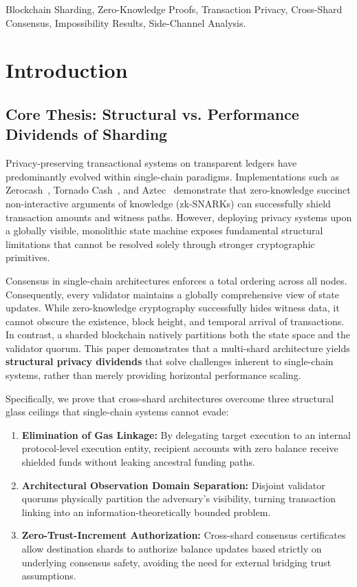 \documentclass[journal,10pt,twocolumn]{IEEEtran}
\theoremstyle{definition}
\theoremstyle{remark}
\begin{document}
\begin{IEEEkeywords}
Blockchain Sharding, Zero-Knowledge Proofs, Transaction Privacy, Cross-Shard Consensus, Impossibility Results, Side-Channel Analysis.
\end{IEEEkeywords}

\section{Introduction}

\subsection{Core Thesis: Structural vs. Performance Dividends of Sharding}
Privacy-preserving transactional systems on transparent ledgers have predominantly evolved within single-chain paradigms. Implementations such as Zerocash~\cite{sasson2014zerocash}, Tornado Cash~\cite{pertsev2019tornado}, and Aztec~\cite{aztec2022} demonstrate that zero-knowledge succinct non-interactive arguments of knowledge (zk-SNARKs) can successfully shield transaction amounts and witness paths. However, deploying privacy systems upon a globally visible, monolithic state machine exposes fundamental structural limitations that cannot be resolved solely through stronger cryptographic primitives.

Consensus in single-chain architectures enforces a total ordering across all nodes. Consequently, every validator maintains a globally comprehensive view of state updates. While zero-knowledge cryptography successfully hides witness data, it cannot obscure the existence, block height, and temporal arrival of transactions. In contrast, a sharded blockchain natively partitions both the state space and the validator quorum. This paper demonstrates that a multi-shard architecture yields \textbf{structural privacy dividends} that solve challenges inherent to single-chain systems, rather than merely providing horizontal performance scaling.

Specifically, we prove that cross-shard architectures overcome three structural glass ceilings that single-chain systems cannot evade:
\begin{enumerate}[leftmargin=*]
    \item \textbf{Elimination of Gas Linkage:} By delegating target execution to an internal protocol-level execution entity, recipient accounts with zero balance receive shielded funds without leaking ancestral funding paths.
    \item \textbf{Architectural Observation Domain Separation:} Disjoint validator quorums physically partition the adversary's visibility, turning transaction linking into an information-theoretically bounded problem.
    \item \textbf{Zero-Trust-Increment Authorization:} Cross-shard consensus certificates allow destination shards to authorize balance updates based strictly on underlying consensus safety, avoiding the need for external bridging trust assumptions.
\end{enumerate}
\end{document}
